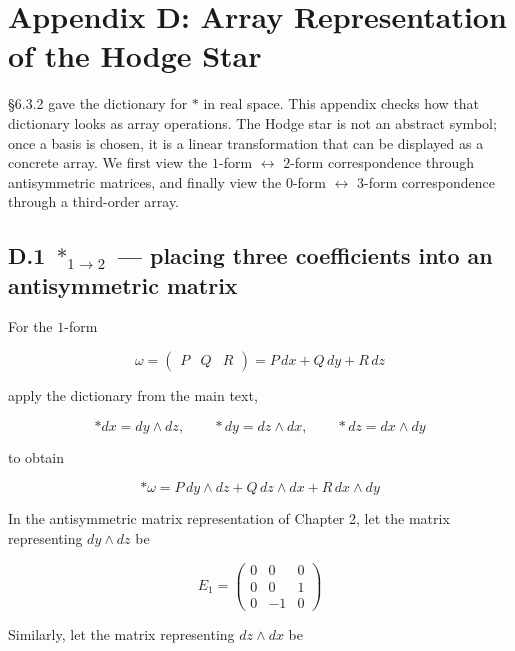 \hypertarget{appendix-d-array-representation-of-the-hodge-star}{%
\section{Appendix D: Array Representation of the Hodge
Star}\label{appendix-d-array-representation-of-the-hodge-star}}

§6.3.2 gave the dictionary for \(\ast\) in real space. This appendix
checks how that dictionary looks as array operations. The Hodge star is
not an abstract symbol; once a basis is chosen, it is a linear
transformation that can be displayed as a concrete array. We first view
the \(1\)-form \(\leftrightarrow\) \(2\)-form correspondence through
antisymmetric matrices, and finally view the \(0\)-form
\(\leftrightarrow\) \(3\)-form correspondence through a third-order
array.

\hypertarget{d.1-ast_1to2-placing-three-coefficients-into-an-antisymmetric-matrix}{%
\subsection{\texorpdfstring{D.1 \(\ast_{1\to2}\) --- placing three
coefficients into an antisymmetric
matrix}{D.1 \textbackslash ast\_\{1\textbackslash to2\} --- placing three coefficients into an antisymmetric matrix}}\label{d.1-ast_1to2-placing-three-coefficients-into-an-antisymmetric-matrix}}

For the \(1\)-form

\[
\omega =
\begin{pmatrix}P & Q & R\end{pmatrix}
=
P\,dx + Q\,dy + R\,dz
\]

apply the dictionary from the main text,

\[
\ast dx = dy \wedge dz,\qquad
\ast dy = dz \wedge dx,\qquad
\ast dz = dx \wedge dy
\]

to obtain

\[
\ast\omega
=
P\,dy\wedge dz
+
Q\,dz\wedge dx
+
R\,dx\wedge dy
\]

In the antisymmetric matrix representation of Chapter 2, let the matrix
representing \(dy\wedge dz\) be

\[
E_1 =
\begin{pmatrix}
0 & 0 & 0 \\
0 & 0 & 1 \\
0 & -1 & 0
\end{pmatrix}
\]

Similarly, let the matrix representing \(dz\wedge dx\) be

